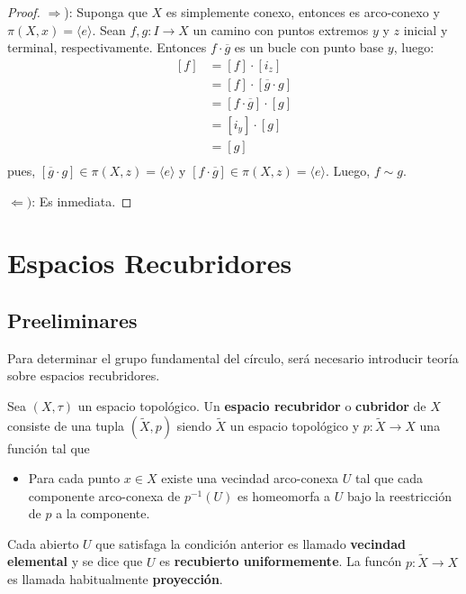 \documentclass[12pt]{report}
\theoremstyle{largebreak}
\newcommand\cf[3]{\ensuremath{#1:#2\rightarrow#3}}
\begin{document}
    \begin{proof}
        $\Rightarrow$): Suponga que $X$ es simplemente conexo, entonces es arco-conexo y $\pi(X,x)=\langle e\rangle$. Sean $\cf{f,g}{I}{X}$ un camino con puntos extremos $y$ y $z$ inicial y terminal, respectivamente. Entonces $f\cdot\overline{g}$ es un bucle con punto base $y$, luego:
        \begin{equation*}
            \begin{split}
                [f]&=[f]\cdot[i_z]\\
                &=[f]\cdot[\overline{g}\cdot g]\\
                &=[f\cdot\overline{g}]\cdot[g]\\
                &=[i_y]\cdot[g]\\
                &=[g]\\
            \end{split}
        \end{equation*}
        pues, $[\overline{g}\cdot g]\in\pi(X,z)=\langle e\rangle$ y $[f\cdot\overline{g}]\in\pi(X,z)=\langle e\rangle$. Luego, $f\sim g$.

        $\Leftarrow)$: Es inmediata. %
    \end{proof}

    \section{Espacios Recubridores}

    \subsection{Preeliminares}

    Para determinar el grupo fundamental del círculo, será necesario introducir teoría sobre espacios recubridores.
    
    \begin{mydef}
        Sea $(X,\tau)$ un espacio topológico. Un \textbf{espacio recubridor} o \textbf{cubridor} de $X$ consiste de una tupla $(\widetilde{X},p)$ siendo $\widetilde{X}$ un espacio topológico y $\cf{p}{\widetilde{X}}{X}$ una función tal que
        \begin{itemize}
            \item Para cada punto $x\in X$ existe una vecindad arco-conexa $U$ tal que cada componente arco-conexa de $p^{-1}(U)$ es homeomorfa a $U$ bajo la reestricción de $p$ a la componente.
        \end{itemize}
        Cada abierto $U$ que satisfaga la condición anterior es llamado \textbf{vecindad elemental} y se dice que $U$ es \textbf{recubierto uniformemente}. La funcón $\cf{p}{\widetilde{X}}{X}$ es llamada habitualmente \textbf{proyección}.
    \end{mydef}
\end{document}
